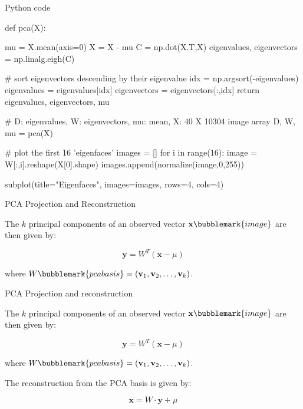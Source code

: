 \documentclass[compress]{beamer}
\begin{document}
\begin{frame}[fragile]{Python code}

\begin{pythoncode}
def pca(X):

    mu = X.mean(axis=0)
    X = X - mu
    C = np.dot(X.T,X)
    eigenvalues, eigenvectors = np.linalg.eigh(C)

    # sort eigenvectors descending by their eigenvalue
    idx = np.argsort(-eigenvalues)
    eigenvalues = eigenvalues[idx]
    eigenvectors = eigenvectors[:,idx]
    return eigenvalues, eigenvectors, mu

# D: eigenvalues, W: eigenvectors, mu: mean, X: 40 X 10304 image array
D, W, mu = pca(X) 

# plot the first 16 'eigenfaces'
images = []
for i in range(16):
    image = W[:,i].reshape(X[0].shape)
    images.append(normalize(image,0,255))

subplot(title="Eigenfaces", images=images, rows=4, cols=4)

\end{pythoncode}
\end{frame}



\begin{frame}{PCA Projection and Reconstruction}

    The $k$ principal components of an observed vector
    $\mathbf{x}\bubblemark{image}$ are then given by:

    \[
        \mathbf{y} = W^{T} (\mathbf{x} - \mu)
    \]

    where $W\bubblemark{pcabasis} = (\mathbf{v}_{1}, \mathbf{v}_{2}, \ldots, \mathbf{v}_{k})$.
    

\end{frame}


\begin{frame}{PCA Projection and reconstruction}

    The $k$ principal components of an observed vector
    $\mathbf{x}\bubblemark{image}$ are then given by:

    \[
        \mathbf{y} = W^{T} (\mathbf{x} - \mu)
    \]

    where $W\bubblemark{pcabasis} = (\mathbf{v}_{1}, \mathbf{v}_{2}, \ldots, \mathbf{v}_{k})$.
    


    The reconstruction from the PCA basis is given by:

    \[
        \mathbf{x} = W \cdot \mathbf{y} + \mu
    \]

\end{frame}
\end{document}

